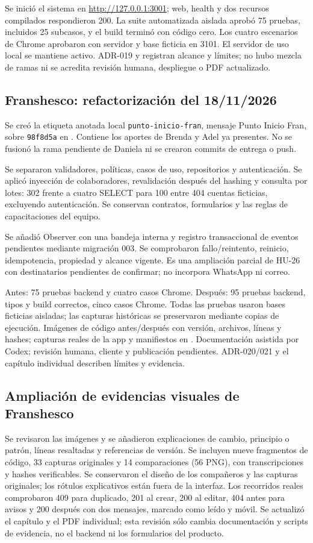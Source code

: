 Se inició el sistema en \url{http://127.0.0.1:3001}; web, health y dos recursos compilados respondieron 200. La suite automatizada aislada aprobó 75 pruebas, incluidos 25 subcasos, y el build terminó con código cero. Los cuatro escenarios de Chrome aprobaron con servidor y base ficticia en 3101. El servidor de uso local se mantiene activo. ADR-019 y  registran alcance y límites; no hubo mezcla de ramas ni se acredita revisión humana, despliegue o PDF actualizado.

\subsection{Franshesco: refactorización del 18/11/2026}
Se creó la etiqueta anotada local \texttt{punto-inicio-fran}, mensaje Punto Inicio Fran, sobre \texttt{98f8d5a} en . Contiene los aportes de Brenda y Adel ya presentes. No se fusionó la rama pendiente de Daniela ni se crearon commits de entrega o push.

Se separaron validadores, políticas, casos de uso, repositorios y autenticación. Se aplicó inyección de colaboradores, revalidación después del hashing y consulta por lotes: 302 frente a cuatro SELECT para 100 entre 404 cuentas ficticias, excluyendo autenticación. Se conservan contratos, formularios y las reglas de capacitaciones del equipo.

Se añadió Observer con una bandeja interna y registro transaccional de eventos pendientes mediante migración 003. Se comprobaron fallo/reintento, reinicio, idempotencia, propiedad y alcance vigente. Es una ampliación parcial de HU-26 con destinatarios pendientes de confirmar; no incorpora WhatsApp ni correo.

Antes: 75 pruebas backend y cuatro casos Chrome. Después: 95 pruebas backend, tipos y build correctos, cinco casos Chrome. Todas las pruebas usaron bases ficticias aisladas; las capturas históricas se preservaron mediante copias de ejecución. Imágenes de código antes/después con versión, archivos, líneas y hashes; capturas reales de la app y manifiestos en . Documentación asistida por Codex; revisión humana, cliente y publicación pendientes. ADR-020/021 y el capítulo individual describen límites y evidencia.

\subsection{Ampliación de evidencias visuales de Franshesco}
Se revisaron las imágenes y se añadieron explicaciones de cambio, principio o patrón, líneas resaltadas y referencias de versión. Se incluyen nueve fragmentos de código, 33 capturas originales y 14 comparaciones (56 PNG), con transcripciones y hashes verificables. Se conservaron el diseño de los compañeros y las capturas originales; los rótulos explicativos están fuera de la interfaz. Los recorridos reales comprobaron 409 para duplicado, 201 al crear, 200 al editar, 404 antes para avisos y 200 después con dos mensajes, marcado como leído y móvil. Se actualizó el capítulo y el PDF individual; esta revisión sólo cambia documentación y scripts de evidencia, no el backend ni los formularios del producto.

